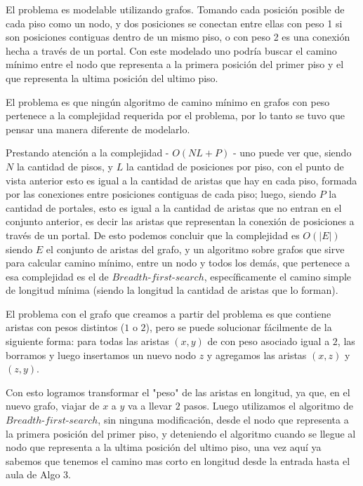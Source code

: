 \documentclass{article}
\theoremstyle{definition}
\theoremstyle{remark}
\begin{document}
El problema es modelable utilizando grafos. Tomando cada posición posible de cada piso como un nodo, y dos posiciones se conectan entre ellas con peso 1 si son posiciones contiguas dentro de un mismo piso, o con peso 2 es una conexión hecha a través de un portal. Con este modelado uno podría buscar el camino mínimo entre el nodo que representa a la primera posición del primer piso y el que representa la ultima posición del ultimo piso.\par
El problema es que ningún algoritmo de camino mínimo en grafos con peso pertenece a la complejidad requerida por el problema, por lo tanto se tuvo que pensar una manera diferente de modelarlo. \par
Prestando atención a la complejidad - $O(NL + P)$ - uno puede ver que, siendo $N$ la cantidad de pisos, y $L$ la cantidad de posiciones por piso, con el punto de vista anterior esto es igual a la cantidad de aristas que hay en cada piso, formada por las conexiones entre posiciones contiguas de cada piso; luego, siendo $P$ la cantidad de portales, esto es igual a la cantidad de aristas que no entran en el conjunto anterior, es decir las aristas que representan la conexión de posiciones a través de un portal. De esto podemos concluir que la complejidad es $O(|E|)$ siendo $E$ el conjunto de aristas del grafo, y un algoritmo sobre grafos que sirve para calcular camino mínimo, entre un nodo y todos los demás, que pertenece a esa complejidad es el de $Breadth$-$first$-$search$, específicamente el camino simple de longitud mínima (siendo la longitud la cantidad de aristas que lo forman).\par
El problema con el grafo que creamos a partir del problema es que contiene aristas con pesos distintos ($1$ o $2$), pero se puede solucionar fácilmente de la siguiente forma: para todas las aristas $(x,y)$ de con peso asociado igual a $2$, las borramos y luego insertamos un nuevo nodo $z$ y agregamos las aristas $(x, z)$ y $(z, y)$.


Con esto logramos transformar el "peso" de las aristas en longitud, ya que, en el nuevo grafo, viajar de $x$ a $y$ va a llevar $2$ pasos. Luego utilizamos el algoritmo de $Breadth$-$first$-$search$, sin ninguna modificación, desde el nodo que representa a la primera posición del primer piso, y deteniendo el algoritmo cuando se llegue al nodo que representa a la ultima posición del ultimo piso, una vez aquí ya sabemos que tenemos el camino mas corto en longitud desde la entrada hasta el aula de Algo 3.
\end{document}

